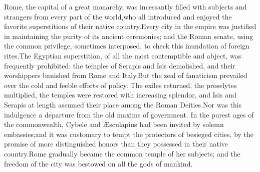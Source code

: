 
Rome, the capital of a great monarchy, was incessantly filled
with subjects and strangers from every part of the world,\footnotemark[13] who
all introduced and enjoyed the favorite superstitions of their
native country.\footnotemark[14] Every city in the empire was justified in
maintaining the purity of its ancient ceremonies; and the Roman
senate, using the common privilege, sometimes interposed, to
check this inundation of foreign rites.\footnotemark[141] The Egyptian
superstition, of all the most contemptible and abject, was
frequently prohibited: the temples of Serapis and Isis
demolished, and their worshippers banished from Rome and Italy.\footnotemark[15]
But the zeal of fanaticism prevailed over the cold and feeble
efforts of policy. The exiles returned, the proselytes
multiplied, the temples were restored with increasing splendor,
and Isis and Serapis at length assumed their place among the
Roman Deities.\footnotemark[151]\footnotemark[16] Nor was this indulgence a departure from
the old maxims of government. In the purest ages of the
commonwealth, Cybele and Æsculapius had been invited by solemn
embassies;\footnotemark[17] and it was customary to tempt the protectors of
besieged cities, by the promise of more distinguished honors than
they possessed in their native country.\footnotemark[18] Rome gradually became
the common temple of her subjects; and the freedom of the city
was bestowed on all the gods of mankind.\footnotemark[19]




